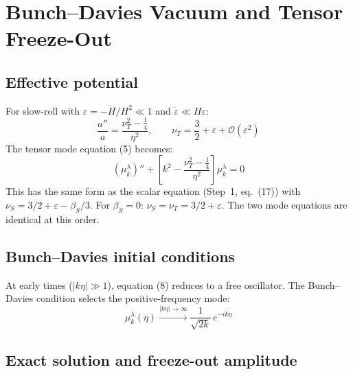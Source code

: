 \documentclass[12pt,a4paper]{article}
\begin{document}
\section{Bunch--Davies Vacuum and Tensor Freeze-Out}

\subsection{Effective potential}

For slow-roll with $\varepsilon = -\dot H/H^2 \ll 1$ and $\dot\varepsilon \ll H\varepsilon$:
\begin{equation}
\frac{a''}{a} = \frac{\nu_T^2 - \tfrac{1}{4}}{\eta^2}, \qquad \nu_T = \frac{3}{2} + \varepsilon + \mathcal{O}(\varepsilon^2) \tag{7}
\end{equation}
The tensor mode equation (5) becomes:
\begin{equation}
(\mu_k^\lambda)'' + \left[k^2 - \frac{\nu_T^2 - \tfrac{1}{4}}{\eta^2}\right]\mu_k^\lambda = 0 \tag{8}
\end{equation}
This has the same form as the scalar equation (Step~1, eq.~(17)) with $\nu_S = 3/2 + \varepsilon - \beta_S/3$. For $\beta_S = 0$: $\nu_S = \nu_T = 3/2 + \varepsilon$. The two mode equations are identical at this order.

\subsection{Bunch--Davies initial conditions}

At early times ($|k\eta| \gg 1$), equation (8) reduces to a free oscillator. The Bunch--Davies condition selects the positive-frequency mode:
\begin{equation}
\mu_k^\lambda(\eta) \xrightarrow{|k\eta|\to\infty} \frac{1}{\sqrt{2k}}\,e^{-ik\eta} \tag{9}
\end{equation}

\subsection{Exact solution and freeze-out amplitude}
\end{document}
